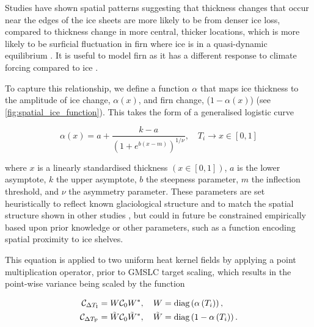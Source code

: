 Studies \autocite[e.g.][]{mcmillanRapidDynamicActivation2014, nilssonElevationChangeAntarctic2022} have shown spatial patterns suggesting that thickness changes that occur near the edges of the ice sheets are more likely to be from denser ice loss, compared to thickness change in more central, thicker locations, which is more likely to be surficial fluctuation in firn where ice is in a quasi-dynamic equilibrium \autocite{liModelingFirnCompaction2011}. It is useful to model firn as it has a different response to climate forcing compared to ice \autocite{ligtenbergImprovedSemiempiricalModel2011}.

To capture this relationship, we define a function $\alpha$ that maps ice thickness to the amplitude of ice change, $\alpha\left(x\right)$, and firn change, ($1-\alpha\left(x\right)$) (see \autoref{fig:spatial_ice_function}). This takes the form of a generalised logistic curve \autocite{richardsFlexibleGrowthFunction1959}

\begin{equation}
    \alpha\left(x\right) = a + \frac{k - a}{\left(1 + e^{b\left(x - m\right)}\right)^{1/\nu}}, \quad T_i \to x \in \left[0,1\right] \label{eq:spatial_prob_func}
\end{equation}

where $x$ is a linearly standardised thickness $\left(x \in \left[0,1\right]\right)$, $a$ is the lower asymptote, $k$ the upper asymptote, $b$ the steepness parameter, $m$ the inflection threshold, and $\nu$ the asymmetry parameter. These parameters are set heuristically to reflect known glaciological structure and to match the spatial structure shown in other studies \autocites[e.g. ][]{meminSnowIceheightChange2014, pritchardExtensiveDynamicThinning2009, shepherdTrendsAntarcticIce2019, nilssonElevationChangeAntarctic2022}, but could in future be constrained empirically based upon prior knowledge or other parameters, such as a function encoding spatial proximity to ice shelves.

This equation is applied to two uniform heat kernel fields by applying a point multiplication operator, prior to GMSLC target scaling, which results in the point-wise variance being scaled by the function

\begin{align}
    \mathcal{C}_{\Delta T_\text{I}} &= W \mathcal{C}_{0} W^*, \quad W = \text{diag}\left(\alpha\left(T_i\right)\right),\label{eq:spatial_ice_covariance} \\
    \mathcal{C}_{\Delta T_\text{F}} &= \tilde{W} \mathcal{C}_{0} \tilde{W}^*, \quad \tilde{W} = \text{diag}\left(1 - \alpha\left(T_i\right)\right). \label{eq:spatial_firn_covariance}
\end{align}

